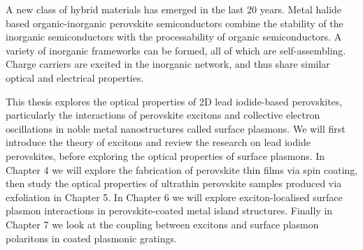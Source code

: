 A new class of hybrid materials has emerged in the last 20 years. Metal halide based organic-inorganic perovskite semiconductors combine the stability of the inorganic semiconductors with the processability of organic semiconductors. A variety of inorganic frameworks can be formed, all of which are self-assembling. Charge carriers are excited in the inorganic network, and thus share similar optical and electrical properties.

This thesis explores the optical properties of 2D lead iodide-based perovskites, particularly the interactions of perovskite excitons and collective electron oscillations in noble metal nanostructures called surface plasmons. We will first introduce the theory of excitons and review the research on lead iodide perovskites, before exploring the optical properties of surface plasmons. In Chapter 4 we will explore the fabrication of perovskite thin films via spin coating, then study the optical properties of ultrathin perovskite samples produced via exfoliation in Chapter 5. In Chapter 6 we will explore exciton-localised surface plasmon interactions in perovskite-coated metal island structures. Finally in Chapter 7 we look at the coupling between excitons and surface plasmon polaritons in coated plasmonic gratings.
